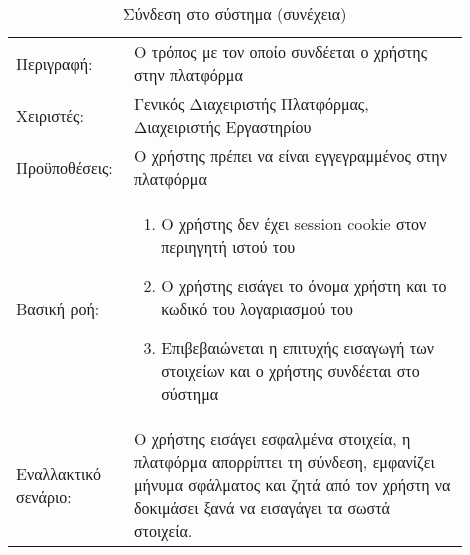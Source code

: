 %
%
\begin{longtable}{|p{0.2\linewidth}|p{0.7\linewidth}|} 
	\caption{Σύνδεση στο σύστημα} \label{tab:use-case-login} \\
	\hline
	\endfirsthead
	\caption{Σύνδεση στο σύστημα (συνέχεια)} \\ 
	\endhead \endfoot 
	Περιγραφή: & Ο τρόπος με τον οποίο συνδέεται ο χρήστης στην πλατφόρμα \\ \hline
	Χειριστές: & Γενικός Διαχειριστής Πλατφόρμας, Διαχειριστής Εργαστηρίου \\ \hline
	Προϋποθέσεις: & Ο χρήστης πρέπει να είναι εγγεγραμμένος στην πλατφόρμα \\ \hline
	Βασική ροή: & 
	\begin{enumerate}
		\vspace{-1cm}
		\addtolength{\itemindent}{-0.4cm}
		\item Ο χρήστης δεν έχει session cookie στον περιηγητή ιστού του
		\item Ο χρήστης εισάγει το όνομα χρήστη και το κωδικό του λογαριασμού του
		\item Επιβεβαιώνεται η επιτυχής εισαγωγή των στοιχείων και ο χρήστης συνδέεται στο σύστημα
		\vspace{-0.7cm}
	\end{enumerate} \\ \hline
	Εναλλακτικό σενάριο: & O χρήστης εισάγει εσφαλμένα στοιχεία, η πλατφόρμα απορρίπτει τη σύνδεση, εμφανίζει μήνυμα σφάλματος και ζητά από τον χρήστη να δοκιμάσει ξανά να εισαγάγει τα σωστά στοιχεία. \\ \hline
\end{longtable}

